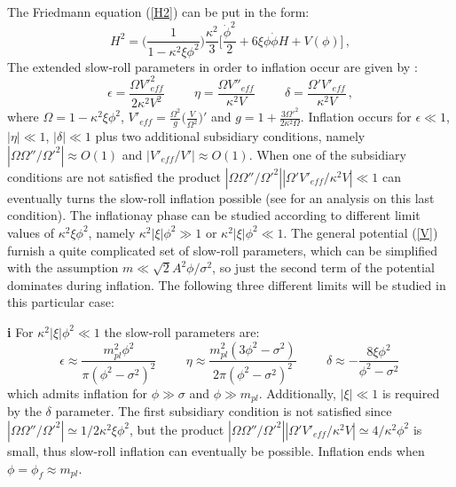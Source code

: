 \documentclass[preprintnumbers,amsmath,amssymb,nofootinbib]{revtex4}
\begin{document}
The Friedmann equation (\ref{H2}) can be put in the form:
\begin{equation}
H^2=\bigg(\frac{1}{1-{\kappa^2\xi \phi^2}}\bigg)\frac{\kappa^2}{3}\bigg[\frac{\dot{\phi}^2}{2}+6\xi \phi\dot{\phi}H+V(\phi) \bigg]\,,\label{H2c}
\end{equation}
The extended slow-roll parameters in order to inflation occur are given by \cite{chiba2008}:
\begin{equation}
    \epsilon = \frac{\Omega V'^2_{eff}}{2\kappa^2 V^2}\hspace{1cm} \eta = \frac{\Omega V''_{eff}}{\kappa^2 V}\hspace{1cm} \delta = \frac{\Omega' V'_{eff}}{\kappa^2 V}\,,\label{slp}
\end{equation}
where $\Omega = 1-\kappa^2\xi\phi^2$, $V'_{eff} = \frac{\Omega^2}{g}\Big(\frac{V}{\Omega^2}\Big)'$ and $g = 1 + \frac{3\Omega'^2}{2\kappa^2\Omega}$. Inflation occurs for $\epsilon \ll 1$, $|\eta|\ll 1$, $|\delta|\ll 1$ plus two additional  subsidiary conditions, namely $|\Omega\Omega''/\Omega'^2| \approx O(1)$ and $|V'_{eff}/V'| \approx O(1)$. When one of the subsidiary conditions are not satisfied the product $|\Omega\Omega''/\Omega'^2||\Omega'V'_{eff}/\kappa^2V| \ll 1$ can eventually turns the slow-roll inflation possible  (see \cite{chiba2008} for an analysis on this last condition). The inflationay phase can be studied according to different limit values of $\kappa^2\xi \phi^2$, namely $\kappa^2|\xi| \phi^2\gg 1$ or $\kappa^2|\xi| \phi^2 \ll 1$. The general potential (\ref{V}) furnish a quite complicated set of slow-roll parameters, which can be simplified with the assumption $m\ll \sqrt{2}A^2\phi/\sigma^2$, so just the second term of the potential dominates during inflation. The following three different limits will be studied in this particular case:


{\bf i} For $\kappa^2|\xi| \phi^2 \ll 1$ the slow-roll parameters are:
\begin{equation}
    \epsilon \approx \frac{m_{pl}^2\phi^2}{\pi(\phi^2-\sigma^2)^2}\hspace{1cm}  \eta \approx \frac{m_{pl}^2(3\phi^2-\sigma^2)}{2\pi(\phi^2-\sigma^2)^2}\hspace{1cm} \delta \approx -\frac{8\xi\phi^2}{\phi^2-\sigma^2}\,\label{c1}
\end{equation}
which admits inflation for $\phi \gg \sigma $ and $\phi \gg m_{pl}$. Additionally, $|\xi| \ll 1$ is required by the $\delta$ parameter. The first subsidiary condition is not satisfied since $|\Omega\Omega''/\Omega'^2| \simeq 1/2\kappa^2\xi\phi^2$, but the product $|\Omega\Omega''/\Omega'^2||\Omega'V'_{eff}/\kappa^2V| \simeq 4/\kappa^2\phi^2$ is small, thus slow-roll inflation can eventually be possible. Inflation ends when $\phi = \phi_f \approx m_{pl}$.
\end{document}
